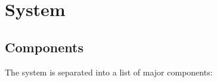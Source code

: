 \documentclass{article}
\begin{document}
    
    
\newpage{}




\section*{System}\label{sec:srs-system}
\renewcommand{\thesubsection}{S.\arabic{subsection}}
\renewcommand{\theHsubsection}{S.\arabic{subsection}}
\setcounter{subsection}{0}

\subsection{Components}\label{subsec:components}
The system is separated into a list of major components:
\end{document}
